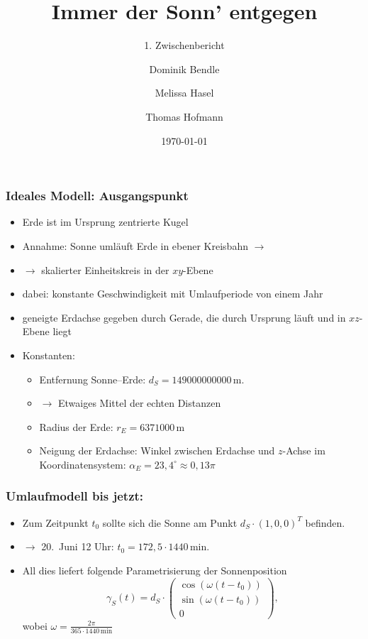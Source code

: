 \documentclass[aspectratio=43]{beamer}
\title{Immer der Sonn' entgegen}
\subtitle{1. Zwischenbericht}
\author{Dominik Bendle \and Melissa Hasel \and Thomas Hofmann}
\date{\today}
\institute{TU Kaiserslautern}
\begin{document}
\begin{frame}[plain]


\end{frame}

\begin{frame}
    \frametitle{Ideales Modell: Ausgangspunkt}
    \begin{itemize}
        \item Erde ist im Ursprung zentrierte Kugel
        \item Annahme: Sonne umläuft Erde in ebener Kreisbahn $\rightarrow$
        \item[]$\rightarrow$ skalierter Einheitskreis in der $xy$-Ebene
        \item dabei: konstante Geschwindigkeit mit Umlaufperiode von einem Jahr
        \item geneigte Erdachse gegeben durch Gerade, die durch Ursprung läuft und in
            $xz$-Ebene liegt
        \item Konstanten:
            \begin{itemize}
                \item Entfernung Sonne--Erde: $d_S = 149000000000\,\mathrm m$.
                \item[]$\rightarrow$ Etwaiges Mittel der echten Distanzen
                \item Radius der Erde: $r_E = 6371000\,\mathrm m$
                \item Neigung der Erdachse: Winkel zwischen Erdachse und $z$-Achse im
                    Koordinatensystem: $\alpha_E = 23{,}4^\circ \approx 0{,}13\pi$
            \end{itemize}
    \end{itemize}
\end{frame}

\begin{frame}
    \frametitle{Umlaufmodell bis jetzt:}
    \begin{itemize}
        \item Zum Zeitpunkt $t_0$ sollte sich die Sonne am Punkt $d_S\cdot(1,0,0)^T$
            befinden.
        \item[]$\rightarrow$ 20.\ Juni 12 Uhr: $t_0 = 172{,}5\cdot1440 \,\mathrm{min}$.
        \item All dies liefert folgende Parametrisierung der Sonnenposition
            \begin{equation*}
                \gamma_S(t) = d_S \cdot
                \begin{pmatrix}
                    \cos(\omega (t - t_0)) \\
                    \sin(\omega (t - t_0)) \\
                    0
                \end{pmatrix},
            \end{equation*}
            wobei $\omega = \frac{2\pi}{365\cdot1440\,\mathrm{min}}$
    \end{itemize}
\end{frame}
\end{document}
